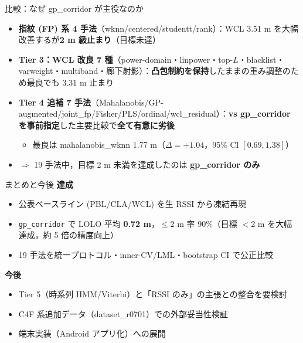 \documentclass[aspectratio=169,unicode,10pt]{beamer}
\begin{document}
\begin{frame}{比較：なぜ gp\_corridor が主役なのか}
  \begin{itemize}
    \item \textbf{指紋 (FP) 系 4 手法}（wknn/centered/studentt/rank）：WCL 3.51 m を大幅改善するが\textbf{2 m 級止まり}（目標未達）
    \item \textbf{Tier 3：WCL 改良 7 種}（power-domain・linpower・top-$L$・blacklist・varweight・multiband・廊下射影）：\textbf{凸包制約を保持}したままの重み調整のため最良でも 3.31 m 止まり
    \item \textbf{Tier 4 追補 7 手法}（Mahalanobis/GP-augmented/joint\_fp/Fisher/PLS/ordinal/wcl\_residual）：\textbf{vs gp\_corridor を事前指定}した主要比較で\textbf{全て有意に劣後}
      \begin{itemize}
        \item 最良は mahalanobis\_wknn 1.77 m（$\Delta{=}+1.04$，95\% CI $[0.69,1.38]$）
      \end{itemize}
    \item $\Rightarrow$ 19 手法中，目標 2 m 未満を達成したのは \textbf{gp\_corridor のみ}
  \end{itemize}
\end{frame}

\begin{frame}{まとめと今後}
  \textbf{達成}
  \begin{itemize}
    \item 公表ベースライン (PBL/CLA/WCL) を生 RSSI から凍結再現
    \item \texttt{gp\_corridor} で LOLO 平均 \textbf{0.72 m}，$\leq$2 m 率 90\%（目標 $<$2 m を大幅達成，約 5 倍の精度向上）
    \item 19 手法を統一プロトコル・inner-CV/LML・bootstrap CI で公正比較
  \end{itemize}
  \textbf{今後}
  \begin{itemize}
    \item Tier 5（時系列 HMM/Viterbi）と「RSSI のみ」の主張との整合を要検討
    \item C4F 系追加データ（dataset\_r0701）での外部妥当性検証
    \item 端末実装（Android アプリ化）への展開\cite{tanaka2023tut}
  \end{itemize}
\end{frame}
\end{document}
